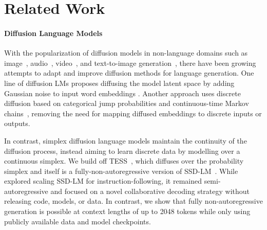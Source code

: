 \section{Related Work}
\paragraph{Diffusion Language Models} With the popularization of diffusion models in non-language domains such as image~\citep{nichol2021improved}, audio~\citep{kong2020diffwave,tae2022editts,Shen2023NaturalSpeech2L}, video~\citep{ho2022video}, and text-to-image generation~\citep{saharia2022photorealistic, ramesh2022hierarchical}, there have been growing attempts to adapt and improve diffusion methods for language generation. One line of diffusion LMs proposes diffusing the model latent space by adding Gaussian noise to input word embeddings \cite{li2022diffusion,gulrajani2023likelihoodbased}. Another approach uses discrete diffusion based on categorical jump probabilities and continuous-time Markov chains~\citep{lou2024discrete,richemond2022categorical,gong2024scalingdiffusionlm}, removing the need for mapping diffused embeddings to discrete inputs or outputs. 

In contrast, simplex diffusion language models maintain the continuity of the diffusion process, instead aiming to learn discrete data by modelling over a continuous simplex. We build off TESS~\citep{karimi-mahabadi-etal-2024-tess}, which diffuses over the probability simplex and itself is a fully-non-autoregressive version of SSD-LM~\citep{han2022ssd}. While \citet{han-etal-2024-david} explored scaling SSD-LM for instruction-following, it remained semi-autoregressive and focused on a novel collaborative decoding strategy without releasing code, models, or data. In contrast, we show that fully non-autoregressive generation is possible at context lengths of up to 2048 tokens while only using publicly available data and model checkpoints.


